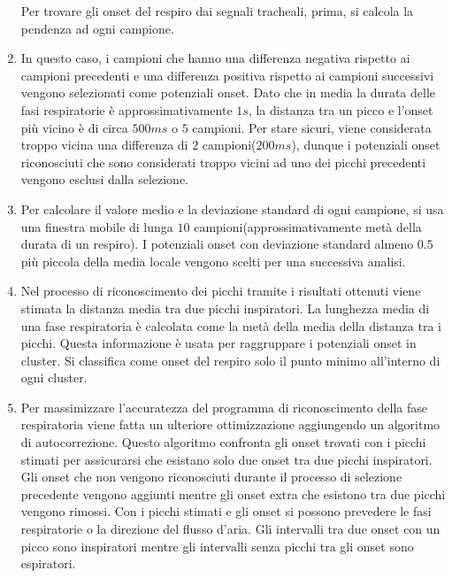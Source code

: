 \begin{frame}
\begin{enumerate}
	Per trovare gli onset del respiro dai segnali tracheali, prima, si calcola la pendenza ad ogni campione. 
      \item
	In questo caso, i campioni che hanno una differenza negativa rispetto ai campioni precedenti e una differenza positiva rispetto ai campioni successivi vengono selezionati come potenziali onset. 
	Dato che in media la durata delle fasi respiratorie \`e approssimativamente $1s$, la distanza tra un picco e l'onset pi\`u vicino \`e di circa $500ms$ o $5$ campioni. 
	Per stare sicuri, viene considerata troppo vicina una differenza di $2$ campioni($200ms$), dunque i potenziali onset riconosciuti che sono considerati troppo vicini ad uno dei picchi precedenti vengono esclusi dalla selezione. 
      \item
	Per calcolare il valore medio e la deviazione standard di ogni campione, si usa una finestra mobile di lunga $10$ campioni(approssimativamente met\`a della durata di un respiro). 
	I potenziali onset con deviazione standard almeno $0.5$ pi\`u piccola della media locale vengono scelti per una successiva analisi. 
      \item
	Nel processo di riconoscimento dei picchi tramite i risultati ottenuti viene stimata la distanza media tra due picchi inspiratori.
	La lunghezza media di una fase respiratoria \`e calcolata come la met\`a della media della distanza tra i picchi. 
	Questa informazione \`e usata per raggruppare i potenziali onset in cluster.
	Si classifica come onset del respiro solo il punto minimo all'interno di ogni cluster.
      \item
	Per massimizzare l'accuratezza del programma di riconoscimento  della fase respiratoria viene fatta un ulteriore ottimizzazione aggiungendo un algoritmo di autocorrezione.
	Questo algoritmo confronta gli onset trovati con i picchi stimati per assicurarsi che esistano solo due onset tra due picchi inspiratori. 
	Gli onset che non vengono riconosciuti durante il processo di selezione precedente vengono aggiunti mentre gli onset extra che esistono tra 
	due picchi vengono rimossi. 
	Con i picchi stimati e gli onset si possono prevedere le fasi respiratorie o la direzione del flusso d'aria. 
	Gli intervalli tra due onset con un picco sono inspiratori mentre gli intervalli senza picchi tra gli onset sono espiratori.
    \end{enumerate}
    

\end{frame}

